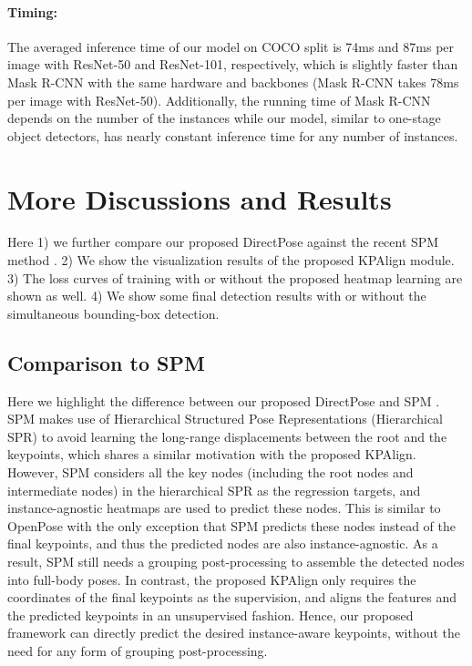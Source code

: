 \documentclass[10pt,twocolumn,letterpaper]{article}
\renewcommand{\texttt}[1]{}
\newcommand{\1}{{\mathbbm{1}}}
\begin{document}
{\paragraph{Timing:} The averaged inference time of our model on COCO \texttt{minival} split is 74ms and 87ms per image with ResNet-50 and ResNet-101, respectively, which is slightly faster than Mask R-CNN with the same hardware and backbones (Mask R-CNN takes 78ms per image with ResNet-50). Additionally, the running time of Mask R-CNN depends on the number of the instances while our model, similar to one-stage object detectors, has nearly constant inference time for any number of instances.



\section{More Discussions and Results}
Here
 1) we further compare our proposed DirectPose against the recent SPM method \cite{Nie_2019_ICCV}. 2) We show the visualization results of the proposed KPAlign module. 3) The loss curves of training with or without the proposed heatmap learning are shown as well. 4) We show some final detection results with or without the simultaneous bounding-box detection.



\subsection{Comparison to SPM}

Here we highlight the difference between our proposed DirectPose and SPM \cite{Nie_2019_ICCV}. SPM makes use of Hierarchical Structured Pose Representations (Hierarchical SPR) to avoid learning the long-range displacements between the root and the keypoints, which shares a similar motivation with the proposed KPAlign. However, SPM considers all the key nodes (including the root nodes and intermediate nodes) in the hierarchical SPR as the regression targets, and instance-agnostic heatmaps are used to predict these nodes. This is similar to  OpenPose \cite{cao2017realtime} with the only exception that SPM predicts these nodes instead of the final keypoints, and thus the predicted nodes are also instance-agnostic. As a result, SPM still needs a grouping post-processing to assemble the detected nodes into full-body poses. In contrast, the proposed KPAlign only requires the coordinates of the final keypoints as the supervision, and aligns the features and the predicted keypoints in an unsupervised fashion. Hence, our proposed framework can directly predict the desired instance-aware keypoints, without the need for any form of grouping post-processing.

}
\end{document}

